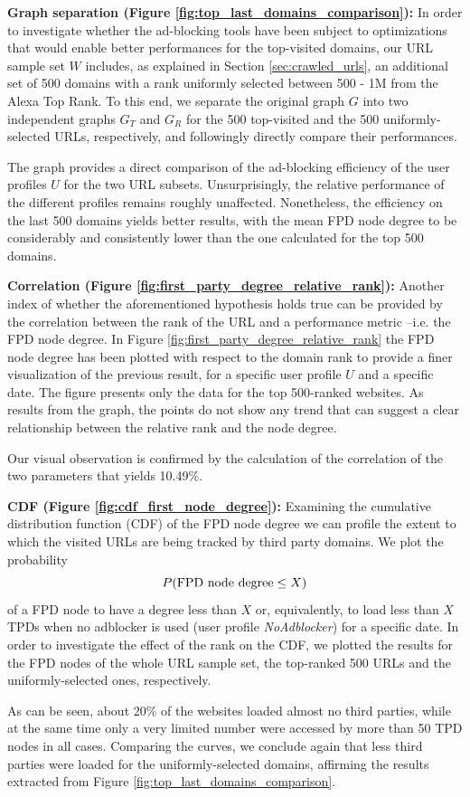 \documentclass{sig-alternate}
\begin{document}
{\color{blue}
\textbf{Graph separation (Figure \ref{fig:top_last_domains_comparison}):} In order to investigate whether the ad-blocking tools have been subject to optimizations that would enable better performances for the top-visited domains, our URL sample set $W$ includes, as explained in Section \ref{sec:crawled_urls}, an additional set of 500 domains with a rank uniformly selected between 500 - 1M from the Alexa Top Rank. To this end, we separate the original graph $G$ into two independent graphs $G_T$ and $G_R$ for the 500 top-visited and the 500 uniformly-selected URLs, respectively, and followingly directly compare their performances.

The graph provides a direct comparison of the {\color{blue}ad-blocking} efficiency of the user profiles $U$ for the two URL subsets. Unsurprisingly, the relative performance of the different profiles remains roughly unaffected. Nonetheless, the efficiency on the last 500 domains yields better results, with the mean FPD node degree to be considerably and consistently lower than the one calculated for the top 500 domains.


\textbf{Correlation (Figure \ref{fig:first_party_degree_relative_rank}):} Another index of whether the aforementioned hypothesis holds true can be provided by the correlation between the rank of the URL and a performance metric --i.e. the FPD node degree. In Figure \ref{fig:first_party_degree_relative_rank} the FPD node degree has been plotted with respect to the domain rank to provide a finer visualization of the previous result, for a specific user profile $U$ and a specific date. The figure presents only the data for the top 500-ranked websites. As results from the graph, the points do not show any trend that can suggest a clear relationship between the relative rank and the node degree.

Our visual observation is confirmed by the calculation of the correlation of the two parameters that yields 10.49\%.


\textbf{CDF (Figure \ref{fig:cdf_first_node_degree}):} Examining the cumulative distribution function (CDF) of the FPD node degree we can profile the extent to which the visited URLs are being tracked by third party domains. We plot the probability $$P(\textnormal{FPD node degree} \leq X)$$ of a FPD node to have a degree less than $X$ or, equivalently, to load less than $X$ TPDs when no adblocker is used (user profile \textit{NoAdblocker}) for a specific date. In order to investigate the effect of the rank on the CDF, we plotted the results for the FPD nodes of the whole URL sample set, the top-ranked 500 URLs and the uniformly-selected ones, respectively.

As can be seen, about 20\% of the websites loaded almost no third parties, while at the same time only a very limited number were accessed by more than 50 TPD nodes in all cases. Comparing the curves, we conclude again that less third parties were loaded for the uniformly-selected domains, affirming the results extracted from Figure \ref{fig:top_last_domains_comparison}.
}
\end{document}
